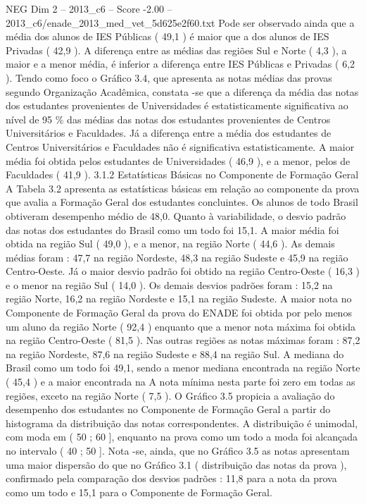 \begin{textsample}{NEG Dim 2 – 2013\_c6 – Score -2.00 – 2013\_c6/enade\_2013\_med\_vet\_5d625e2f60.txt}
Pode ser observado ainda que a média dos alunos de IES Públicas ( 49,1 ) é maior que a dos alunos de IES Privadas ( 42,9 ).
A diferença entre as médias das regiões Sul e Norte ( 4,3 ), a maior e a menor média, é inferior a diferença entre IES Públicas e Privadas ( 6,2 ).
Tendo como foco o Gráfico 3.4, que apresenta as notas médias das provas segundo Organização Acadêmica, constata -se que a diferença da média das notas dos estudantes provenientes de Universidades é estatisticamente significativa ao nível de 95 \% das médias das notas dos estudantes provenientes de Centros Universitários e Faculdades.
Já a diferença entre a média dos estudantes de Centros Universitários e Faculdades não é significativa estatisticamente.
A maior média foi obtida pelos estudantes de Universidades ( 46,9 ), e a menor, pelos de Faculdades ( 41,9 ). 3.1.2 Estatísticas Básicas no Componente de Formação Geral A Tabela 3.2 apresenta as estatísticas básicas em relação ao componente da prova que avalia a Formação Geral dos estudantes concluintes.
Os alunos de todo Brasil obtiveram desempenho médio de 48,0.
Quanto à variabilidade, o desvio padrão das notas dos estudantes do Brasil como um todo foi 15,1.
A maior média foi obtida na região Sul ( 49,0 ), e a menor, na região Norte ( 44,6 ).
As demais médias foram : 47,7 na região Nordeste, 48,3 na região Sudeste e 45,9 na região Centro-Oeste.
Já o maior desvio padrão foi obtido na região Centro-Oeste ( 16,3 ) e o menor na região Sul ( 14,0 ).
Os demais desvios padrões foram : 15,2 na região Norte, 16,2 na região Nordeste e 15,1 na região Sudeste.
A maior nota no Componente de Formação Geral da prova do ENADE foi obtida por pelo menos um aluno da região Norte ( 92,4 ) enquanto que a menor nota máxima foi obtida na região Centro-Oeste ( 81,5 ).
Nas outras regiões as notas máximas foram : 87,2 na região Nordeste, 87,6 na região Sudeste e 88,4 na região Sul.
A mediana do Brasil como um todo foi 49,1, sendo a menor mediana encontrada na região Norte ( 45,4 ) e a maior encontrada na A nota mínima nesta parte foi zero em todas as regiões, exceto na região Norte ( 7,5 ).
O Gráfico 3.5 propicia a avaliação do desempenho dos estudantes no Componente de Formação Geral a partir do histograma da distribuição das notas correspondentes.
A distribuição é unimodal, com moda em ( 50 ; 60 ], enquanto na prova como um todo a moda foi alcançada no intervalo ( 40 ; 50 ].
Nota -se, ainda, que no Gráfico 3.5 as notas apresentam uma maior dispersão do que no Gráfico 3.1 ( distribuição das notas da prova ), confirmado pela comparação dos desvios padrões : 11,8 para a nota da prova como um todo e 15,1 para o Componente de Formação Geral.

\end{textsample}
